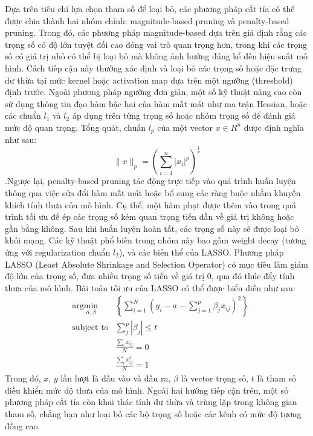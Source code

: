 Dựa trên tiêu chí lựa chọn tham số để loại bỏ, các phương pháp cắt tỉa có thể được chia thành hai nhóm chính: magnitude-based pruning và penalty-based pruning. Trong đó, các phương pháp magnitude-based dựa trên giả định rằng các trọng số có độ lớn tuyệt đối cao đóng vai trò quan trọng hơn, trong khi các trọng số có giá trị nhỏ có thể bị loại bỏ mà không ảnh hưởng đáng kể đến hiệu suất mô hình. Cách tiếp cận này thường xác định và loại bỏ các trọng số hoặc đặc trưng dư thừa tại mức kernel hoặc activation map dựa trên một ngưỡng (threshold) định trước. Ngoài phương pháp ngưỡng đơn giản, một số kỹ thuật nâng cao còn sử dụng thông tin đạo hàm bậc hai của hàm mất mát như ma trận Hessian, hoặc các chuẩn $l_1$ và $l_2$ áp dụng trên từng trọng số hoặc nhóm trọng số để đánh giá mức độ quan trọng. Tổng quát, chuẩn $l_p$ của một vector $x\in R^n$ được định nghĩa như sau:
\begin{equation}
    \lVert x \rVert_p = (\sum\limits_{i=1}^n|x_i|^p)^{\frac{1}{p}}
\end{equation}.Ngược lại, penalty-based pruning tác động trực tiếp vào quá trình huấn luyện thông qua việc sửa đổi hàm mất mát hoặc bổ sung các ràng buộc nhằm khuyến khích tính thưa của mô hình. Cụ thể, một hàm phạt được thêm vào trong quá trình tối ưu để ép các trọng số kém quan trọng tiến dần về giá trị không hoặc gần bằng không. Sau khi huấn luyện hoàn tất, các trọng số này sẽ được loại bỏ khỏi mạng. Các kỹ thuật phổ biến trong nhóm này bao gồm weight decay (tương ứng với regularization chuẩn $l_2$), và các biến thể của LASSO. Phương pháp LASSO (Least Absolute Shrinkage and Selection Operator) có mục tiêu làm giảm độ lớn của trọng số, đưa nhiều trọng số tiến về giá trị 0, qua đó thúc đẩy tính thưa của mô hình. Bài toán tối ưu của LASSO có thể được biểu diễn như sau:
\begin{equation}
\begin{aligned}
& \text{arg}\min\limits_{\alpha,\beta}&\left\{\sum\limits_{i=1}^N(y_i-a-\sum\limits_{j=1}^p\beta_jx_{ij})^2\right\} \\
& \text{subject to} & \sum\limits_j^p|\beta_j| \leq t \\
&&\frac{\sum_ix_{ij}}{N}=0\\
&&\frac{\sum_ix_{ij}^2}{N}=1
\end{aligned}
\end{equation}
Trong đó, $x$, $y$ lần lượt là đầu vào và đầu ra, $\beta$ là vector trọng số, $t$ là tham số điều khiển mức độ thưa của mô hình. Ngoài hai hướng tiếp cận trên, một số phương pháp cắt tỉa còn khai thác tính dư thừa và trùng lặp trong không gian tham số, chẳng hạn như loại bỏ các bộ trọng số hoặc các kênh có mức độ tương đồng cao.
